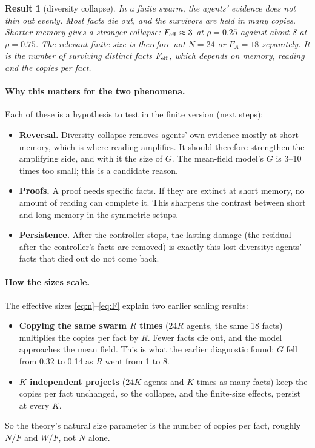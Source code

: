 \documentclass[10pt,a4paper]{article}
\newtheorem{result}{Result}
\begin{document}
\begin{result}[diversity collapse]
In a finite swarm, the agents' evidence does not thin out evenly. Most facts die out, and the survivors are held in many
copies. Shorter memory gives a stronger collapse: $F_{\rm eff}\approx3$ at $\rho=0.25$ against about 8 at $\rho=0.75$.
The relevant finite size is therefore not $N=24$ or $F_A=18$ separately. It is the number of surviving distinct facts
$F_{\rm eff}$, which depends on memory, reading and the copies per fact.
\end{result}

\paragraph{Why this matters for the two phenomena.} Each of these is a hypothesis to test in the finite version (next
steps):
\begin{itemize}
\item \textbf{Reversal.} Diversity collapse removes agents' own evidence mostly at short memory, which is where reading
  amplifies. It should therefore strengthen the amplifying side, and with it the size of $G$. The mean-field model's $G$
  is 3--10 times too small; this is a candidate reason.
\item \textbf{Proofs.} A proof needs specific facts. If they are extinct at short memory, no amount of reading can
  complete it. This sharpens the contrast between short and long memory in the symmetric setups.
\item \textbf{Persistence.} After the controller stops, the lasting damage (the residual after the controller's facts
  are removed) is exactly this lost diversity: agents' facts that died out do not come back.
\end{itemize}

\paragraph{How the sizes scale.} The effective sizes \eqref{eq:n}--\eqref{eq:F} explain two earlier scaling results:
\begin{itemize}
\item \textbf{Copying the same swarm $R$ times} (24$R$ agents, the same 18 facts) multiplies the copies per fact by $R$.
  Fewer facts die out, and the model approaches the mean field. This is what the earlier diagnostic found: $G$ fell from
  0.32 to 0.14 as $R$ went from 1 to 8.
\item \textbf{$K$ independent projects} (24$K$ agents and $K$ times as many facts) keep the copies per fact unchanged,
  so the collapse, and the finite-size effects, persist at every $K$.
\end{itemize}
So the theory's natural size parameter is the number of copies per fact, roughly $N/F$ and $W/F$, not $N$ alone.
\end{document}
